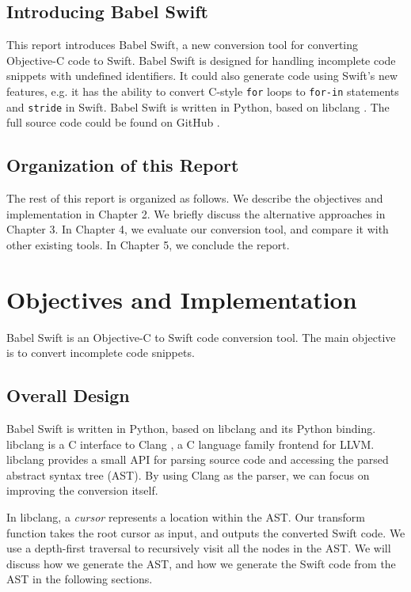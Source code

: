 \documentclass{sfuthesis}
\begin{document}
\section{Introducing Babel Swift}

This report introduces Babel Swift, a new conversion tool for converting Objective-C code to Swift. Babel Swift is designed for handling incomplete code snippets with undefined identifiers. It could also generate code using Swift's new features, e.g. it has the ability to convert C-style \texttt{for} loops to \texttt{for-in} statements and \texttt{stride} in Swift. Babel Swift is written in Python, based on libclang \cite{libclang}. The full source code could be found on GitHub \cite{babelswift}.

\section{Organization of this Report}

The rest of this report is organized as follows. We describe the objectives and implementation in Chapter 2. We briefly discuss the alternative approaches in Chapter 3. In Chapter 4, we evaluate our conversion tool, and compare it with other existing tools. In Chapter 5, we conclude the report.

\chapter{Objectives and Implementation}

Babel Swift is an Objective-C to Swift code conversion tool. The main objective is to convert incomplete code snippets.

\section{Overall Design}

Babel Swift is written in Python, based on libclang \cite{libclang} and its Python binding. libclang is a C interface to Clang \cite{clang}, a C language family frontend for LLVM. libclang provides a small API for parsing source code and accessing the parsed abstract syntax tree (AST). By using Clang as the parser, we can focus on improving the conversion itself.

In libclang, a \emph{cursor} represents a location within the AST. Our transform function takes the root cursor as input, and outputs the converted Swift code. We use a depth-first traversal to recursively visit all the nodes in the AST. We will discuss how we generate the AST, and how we generate the Swift code from the AST in the following sections.
\end{document}
